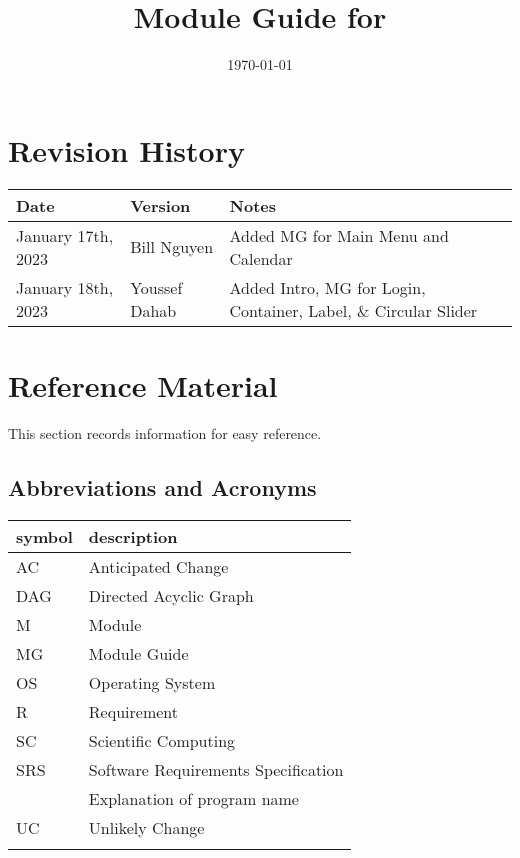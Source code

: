 \documentclass[12pt, titlepage]{article}
\begin{document}
\title{Module Guide for \progname{}} 
\author{\authname}
\date{\today}

\maketitle


\section{Revision History}

\begin{tabularx}{\textwidth}{p{3cm}p{2cm}X}
	\toprule {\bf Date} & {\bf Version} & {\bf Notes}\\
	\midrule
	January 17th, 2023 & Bill Nguyen  & Added MG for Main Menu and Calendar\\
	January 18th, 2023 & Youssef Dahab & Added Intro, MG for Login, Container, Label, \& Circular Slider\\
	\bottomrule
\end{tabularx}

\newpage

\section{Reference Material}

This section records information for easy reference.

\subsection{Abbreviations and Acronyms}

\renewcommand{\arraystretch}{1.2}
\begin{tabular}{l l} 
	\toprule		
	\textbf{symbol} & \textbf{description}\\
	\midrule 
	AC & Anticipated Change\\
	DAG & Directed Acyclic Graph \\
	M & Module \\
	MG & Module Guide \\
	OS & Operating System \\
	R & Requirement\\
	SC & Scientific Computing \\
	SRS & Software Requirements Specification\\
	\progname & Explanation of program name\\
	UC & Unlikely Change \\
	\wss{etc.} & \wss{...}\\
	\bottomrule
\end{tabular}\\
\end{document}
